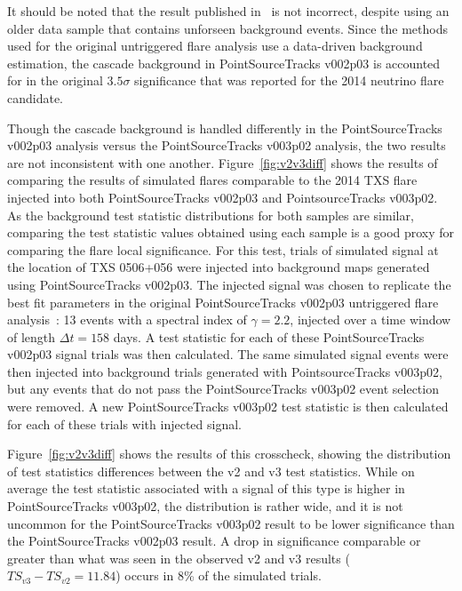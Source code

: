 It should be noted that the result published in~\cite{TXS_Archival} is not incorrect, despite using an older data sample that contains unforseen background events. Since the methods used for the original untriggered flare analysis use a data-driven background estimation, the cascade background in PointSourceTracks v002p03 is accounted for in the original $3.5 \sigma$ significance that was reported for the 2014 neutrino flare candidate. 

Though the cascade background is handled differently in the PointSourceTracks v002p03 analysis versus the PointSourceTracks v003p02 analysis, the two results are not inconsistent with one another. Figure~\ref{fig:v2v3diff} shows the results of comparing the results of simulated flares comparable to the 2014 TXS flare injected into both PointSourceTracks v002p03 and PointsourceTracks v003p02.   As the background test statistic distributions for both samples are similar, comparing the test statistic values obtained using each sample is a good proxy for comparing the flare local significance.  For this test, trials of simulated signal at the location of TXS 0506+056 were injected into background maps generated using PointSourceTracks v002p03. The injected signal was chosen to replicate the best fit parameters in the original PointSourceTracks v002p03 untriggered flare analysis~\cite{TXS_Archival}: 13 events with a spectral index of $\gamma=2.2$, injected over a time window of length $\Delta t = 158$ days. A test statistic for each of these PointSourceTracks v002p03 signal trials was then calculated. The same simulated signal events were then injected into background trials generated with PointsourceTracks v003p02, but any events that do not pass the PointSourceTracks v003p02 event selection were removed.  A new PointSourceTracks v003p02 test statistic is then calculated for each of these trials with injected signal. 

Figure~\ref{fig:v2v3diff} shows the results of this crosscheck, showing the distribution of test statistics differences between the v2 and v3 test statistics. While on average the test statistic associated with a signal of this type is higher in PointSourceTracks v003p02, the distribution is rather wide, and it is not uncommon for the PointSourceTracks v003p02 result to be lower significance than the PointSourceTracks v002p03 result. A drop in significance comparable or greater than what was seen in the observed v2 and v3 results ($TS_{v3}-TS_{v2}=11.84$) occurs in 8\% of the simulated trials. 


